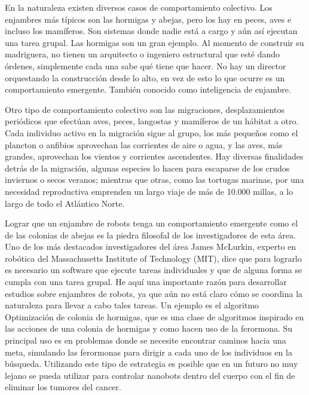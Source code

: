 En la naturaleza existen diversos casos de comportamiento colectivo. Los enjambres más típicos son las hormigas y abejas, pero los hay en peces, aves e incluso los mamíferos. Son sistemas donde nadie está a cargo y aún así ejecutan una tarea grupal. Las hormigas son un gran ejemplo. Al momento de construir su madriguera, no tienen un arquitecto o ingeniero estructural que esté dando órdenes, simplemente cada una sabe qué tiene que hacer. No hay un director orquestando la construcción desde lo alto, en vez de esto lo que ocurre es un comportamiento emergente. También conocido como inteligencia de enjambre.

Otro tipo de comportamiento colectivo son las migraciones, desplazamientos periódicos que efectúan aves, peces, langostas y mamíferos de un hábitat a otro. Cada individuo activo en la migración sigue al grupo, los más pequeños como el plancton o anfibios aprovechan las corrientes de aire o agua, y las aves, más grandes, aprovechan los vientos y corrientes ascendentes. Hay diversas finalidades detrás de la migración, algunas especies lo hacen para escaparse de los crudos inviernos o secos veranos; mientras que otras, como las tortugas marinas, por una necesidad reproductiva emprenden un largo viaje de más de 10.000 millas, a lo largo de todo el Atlántico Norte.

Lograr que un enjambre de robots tenga un comportamiento emergente como el de las colonias de abejas es la piedra filosofal de los investigadores de esta área. Uno de los más destacados investigadores del área James McLurkin, experto en robótica del Massachusetts Institute of Technology (MIT), dice que para lograrlo es necesario un software que ejecute tareas individuales y que de alguna forma se cumpla con una tarea grupal. He aquí una importante razón para desarrollar estudios sobre enjambres de robots, ya que aún no está claro cómo se coordina la naturaleza para llevar a cabo tales tareas. Un ejemplo es el algoritmo Optimización de colonia de hormigas, que es una clase de algoritmos inspirado en las acciones de una colonia de hormigas y como hacen uso de la ferormona. Su principal uso es en problemas donde se necesite encontrar caminos hacia una meta, simulando las ferormonas para dirigir a cada uno de los individuos en la búsqueda. Utilizando este tipo de estrategia es posible que en un futuro no muy lejano se pueda utilizar para controlar nanobots dentro del cuerpo con el fin de eliminar los tumores del cancer.

